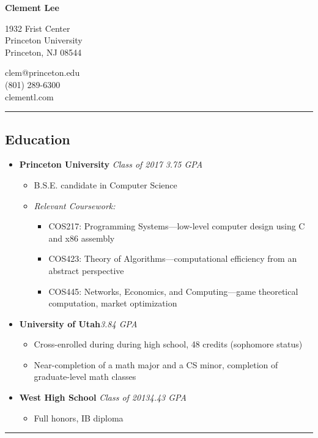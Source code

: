 \documentclass[11pt]{article}
\begin{document}
\begin{center}

\vspace{-5em}
{\LARGE {\textbf{Clement Lee}}}

\begin{multicols}{2}
\begin{flushright}
1932 Frist Center\\
Princeton University\\
Princeton, NJ 08544
\end{flushright}
\begin{flushleft}
clem@princeton.edu\\
(801) 289-6300\\
clementl.com
\end{flushleft}
\end{multicols}
\end{center}

\hrule
\vspace{-1em}
\subsection*{\textbf{Education}}
\begin{itemize}[nolistsep,topsep=0pt, label=]
\itemsep0.33em

\item \textbf{Princeton University} \emph{Class of 2017} \hfill \emph{3.75 GPA}
\begin{itemize}[nolistsep,topsep=0pt, label=]
\item B.S.E. candidate in Computer Science
\item \emph{Relevant Coursework:}
\begin{itemize}[nolistsep,topsep=0pt, label=]
\item {COS217:} Programming Systems---low-level computer design using C and x86 assembly
\item {COS423:} Theory of Algorithms---computational efficiency from an abstract perspective
\item {COS445:} Networks, Economics, and Computing---game theoretical computation, market optimization
\end{itemize}
\end{itemize}

\item \textbf{University of Utah}\hfill \emph{3.84 GPA}
\begin{itemize}[nolistsep,topsep=0pt, label=]
\item Cross-enrolled during during high school, 48 credits (sophomore status)
\item Near-completion of a math major and a CS minor, completion of graduate-level math classes
\end{itemize}

\item \textbf{West High School} \emph{Class of 2013}\hfill \emph{4.43 GPA}
\begin{itemize}[nolistsep,topsep=0pt, label=]
\item Full honors, IB diploma
\end{itemize}
\end{itemize}
\vspace{0.4em}
\hrule
\vspace{-1em}
\end{document}
